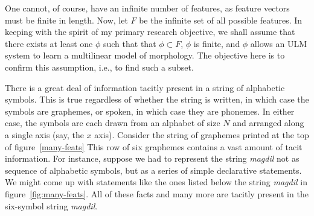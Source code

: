 One cannot, of course, have an infinite number of features, as feature vectors must be finite in length.
Now, let $F$ be the infinite set of all possible features. In keeping with the spirit of my primary research objective, we shall assume that there exists at least one $\phi$ such that that $\phi \subset F$, $\phi$ is finite, and $\phi$ allows an ULM system to learn a multilinear model of morphology. The objective here is to confirm this assumption, i.e., to find such a subset.

There is a great deal of information tacitly present in a string of alphabetic symbols.
	 This is true regardless of whether the string is written, in which case the 
	 symbols are graphemes, or spoken, in which case they are phonemes. In either 
	 case, the symbols are each drawn from an alphabet of size $N$ and arranged 
	 along a single axis (say, the $x$ axis).
Consider the string of graphemes printed at the top of figure~\ref{many-feats}
This row of six graphemes contains a vast amount of tacit information. For instance, 
suppose we had to represent the string \textit{magdil} not as sequence of alphabetic 
symbols, but as a series of simple declarative statements. We might come up with 
statements like the ones listed below the string \textit{magdil} in figure~\ref{fig:many-feats}. All of these
facts and many more are tacitly present in the six-symbol string \textit{magdil}.

